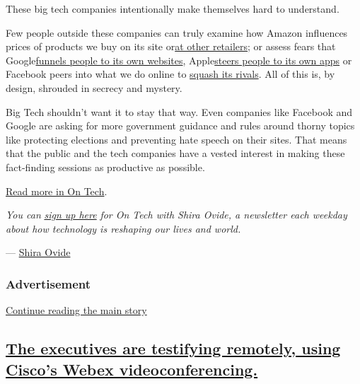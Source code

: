 These big tech companies intentionally make themselves hard to
understand.

Few people outside these companies can truly examine how Amazon
influences prices of products we buy on its site
or\href{https://www.bloomberg.com/news/articles/2019-08-05/amazon-is-squeezing-sellers-that-offer-better-prices-on-walmart}{at
other retailers}; or assess fears that
Google\href{https://themarkup.org/google-the-giant/2020/07/28/google-search-results-prioritize-google-products-over-competitors}{funnels
people to its own websites},
Apple\href{https://www.nytimes.com/interactive/2019/09/09/technology/apple-app-store-competition.html}{steers
people to its own apps} or Facebook peers into what we do online to
\href{https://www.nytimes.com/2018/12/05/technology/facebook-emails-privacy-data.html}{squash
its rivals}. All of this is, by design, shrouded in secrecy and mystery.

Big Tech shouldn't want it to stay that way. Even companies like
Facebook and Google are asking for more government guidance and rules
around thorny topics like protecting elections and preventing hate
speech on their sites. That means that the public and the tech companies
have a vested interest in making these fact-finding sessions as
productive as possible.

\href{https://www.nytimes.com/2020/07/29/technology/congress-big-tech.html}{Read
more in On Tech}.

\emph{You can}
\href{https://www.nytimes.com/newsletters/signup/OT}{\emph{sign up
here}} \emph{for On Tech with Shira Ovide, a newsletter each weekday
about how technology is reshaping our lives and world.}

--- \href{https://www.nytimes.com/by/shira-ovide}{Shira Ovide}

\hypertarget{advertisement-3}{%
\subsubsection{Advertisement}\label{advertisement-3}}

\protect\hyperlink{after-dfp-ad-mid1}{Continue reading the main story}

\hypertarget{the-executives-are-testifying-remotely-using-ciscos-webex-videoconferencing}{%
\subsection{\texorpdfstring{\protect\hyperlink{the-executives-are-testifying-remotely-using-ciscos-webex-videoconferencing}{The
executives are testifying remotely, using Cisco's Webex
videoconferencing.}}{The executives are testifying remotely, using Cisco's Webex videoconferencing.}}\label{the-executives-are-testifying-remotely-using-ciscos-webex-videoconferencing}}

